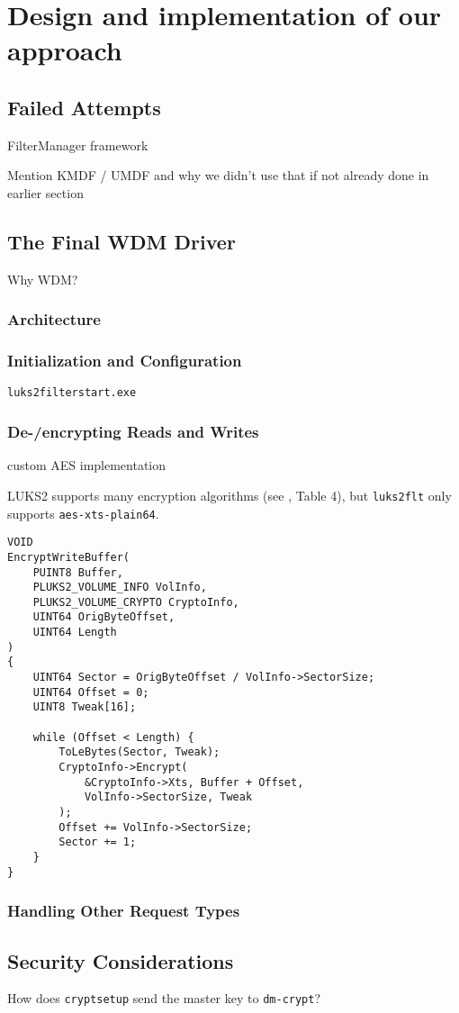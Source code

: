 \section{Design and implementation of our approach}
\label{chap:ourapproach}

\subsection{Failed Attempts}
\label{chap:ourapproach.failed}
FilterManager framework

Mention KMDF / UMDF and why we didn't use that if not already done in earlier section

\subsection{The Final WDM Driver}
\label{chap:ourapproach.final}
Why WDM?

\subsubsection{Architecture}
\label{chap:ourapproach.final.architecture}

\subsubsection{Initialization and Configuration}
\label{chap:ourapproach.final.init}
\texttt{luks2filterstart.exe}

\subsubsection{De-/encrypting Reads and Writes}
\label{chap:ourapproach.final.de_encrypting}
custom AES implementation

LUKS2 supports many encryption algorithms (see \cite{Broz2018}, Table 4), but \texttt{luks2flt} only supports \texttt{aes-xts-plain64}.

\begin{lstlisting}[style=CStyle]
VOID
EncryptWriteBuffer(
    PUINT8 Buffer,
    PLUKS2_VOLUME_INFO VolInfo,
    PLUKS2_VOLUME_CRYPTO CryptoInfo,
    UINT64 OrigByteOffset,
    UINT64 Length
)
{
    UINT64 Sector = OrigByteOffset / VolInfo->SectorSize;
    UINT64 Offset = 0;
    UINT8 Tweak[16];

    while (Offset < Length) {
        ToLeBytes(Sector, Tweak);
        CryptoInfo->Encrypt(
            &CryptoInfo->Xts, Buffer + Offset,
            VolInfo->SectorSize, Tweak
        );
        Offset += VolInfo->SectorSize;
        Sector += 1;
    }
}
\end{lstlisting}

\subsubsection{Handling Other Request Types}
\label{chap:ourapproach.final.otherrequests}

\subsection{Security Considerations}
\label{chap:ourapproach.security}
How does \texttt{cryptsetup} send the master key to \texttt{dm-crypt}?